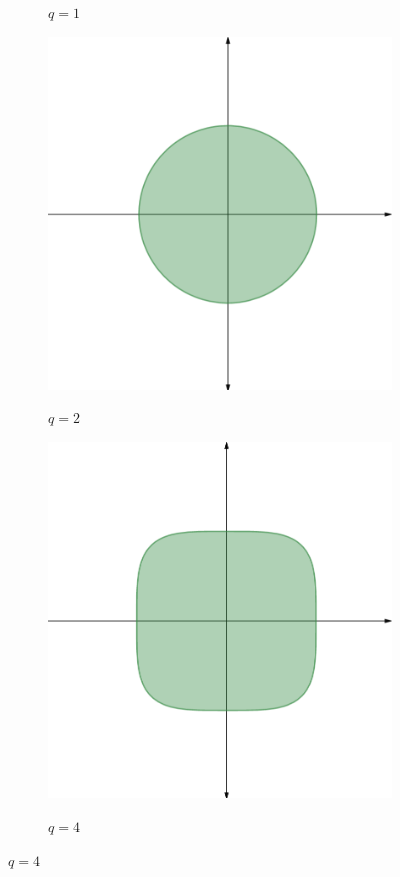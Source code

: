 \begin{figure}
\begin{subfigure}{0.2\textwidth}
	\label{norm_1_figure}
	\caption*{$q = 1$}
	\end{subfigure}\hspace{0.5cm}
	\begin{subfigure}{0.2\textwidth}
	\centering
	\includegraphics[width = \textwidth]{figures/norm_2.png}
	\label{norm_2_figure}
	\caption*{$q = 2$}
	\end{subfigure}\hspace{0.5cm}
	\begin{subfigure}{0.2\textwidth}
	\centering
	\includegraphics[width = \textwidth]{figures/norm_4.png}
	\label{norm_4_figure}
	\caption*{$q = 4$}
	\end{subfigure}


\end{figure}
